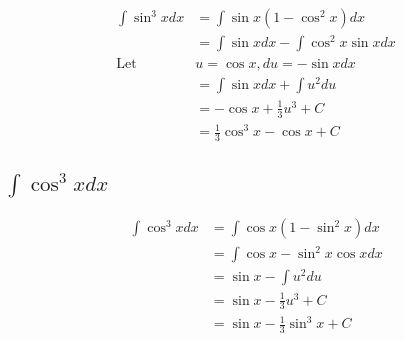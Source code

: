 \documentclass[letterpaper]{article}
\begin{document}
\[\begin{aligned}
   \int \sin  ^3 x  dx &=\int \sin  x (1 - \cos  ^2 x) dx\\
   &=\int \sin  x dx  -\int \cos ^2 x \sin  x dx\\
   \text{Let }& u = \cos  x, du = - \sin  x dx\\
   &=\int \sin  x dx  +\int u ^2 du\\
   &= - \cos  x + \frac{1}{3} u ^3 +C\\
   &= \frac{1}{3} \cos  ^3 x - \cos  x +C
   \end{aligned}\]


\subsection{\(\int \cos ^3 x dx\)}
\label{sec:orgd2ce4b6}

\[\begin{aligned}
   \int \cos  ^3 x dx &=\int \cos  x (1 - \sin  ^2 x) dx \\
   &=\int \cos  x - \sin  ^2 x \cos  x dx \\
   &= \sin  x -\int u ^2 du\\
   &= \sin  x - \frac{1}{3} u ^3 +C\\
   &= \sin  x - \frac{1}{3} \sin  ^3 x +C
   \end{aligned}\]
\end{document}
